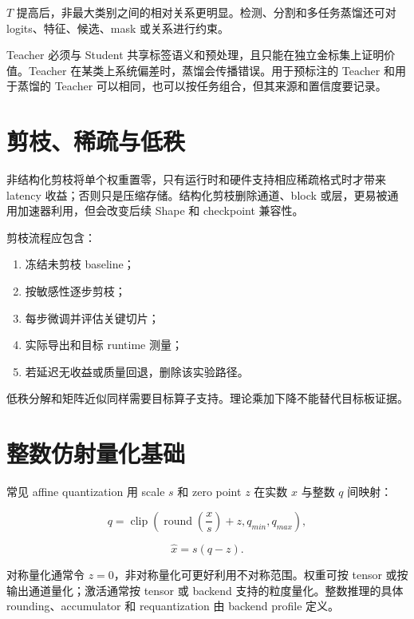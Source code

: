 $T$ 提高后，非最大类别之间的相对关系更明显。检测、分割和多任务蒸馏还可对 logits、特征、候选、mask 或关系进行约束。

Teacher 必须与 Student 共享标签语义和预处理，且只能在独立金标集上证明价值。Teacher 在某类上系统偏差时，蒸馏会传播错误。用于预标注的 Teacher 和用于蒸馏的 Teacher 可以相同，也可以按任务组合，但其来源和置信度要记录。

\section{剪枝、稀疏与低秩}

非结构化剪枝将单个权重置零，只有运行时和硬件支持相应稀疏格式时才带来 latency 收益；否则只是压缩存储。结构化剪枝删除通道、block 或层，更易被通用加速器利用，但会改变后续 Shape 和 checkpoint 兼容性。

剪枝流程应包含：

\begin{enumerate}
  \item 冻结未剪枝 baseline；
  \item 按敏感性逐步剪枝；
  \item 每步微调并评估关键切片；
  \item 实际导出和目标 runtime 测量；
  \item 若延迟无收益或质量回退，删除该实验路径。
\end{enumerate}

低秩分解和矩阵近似同样需要目标算子支持。理论乘加下降不能替代目标板证据。

\section{整数仿射量化基础}

常见 affine quantization 用 scale $s$ 和 zero point $z$ 在实数 $x$ 与整数 $q$ 间映射：

\begin{equation}
  q=\operatorname{clip}\left(\operatorname{round}\left(\frac{x}{s}\right)+z,
  q_{min},q_{max}\right),
\end{equation}

\begin{equation}
  \hat{x}=s(q-z).
\end{equation}

对称量化通常令 $z=0$，非对称量化可更好利用不对称范围。权重可按 tensor 或按输出通道量化；激活通常按 tensor 或 backend 支持的粒度量化。整数推理的具体 rounding、accumulator 和 requantization 由 backend profile 定义\cite{integer-quantization}。


